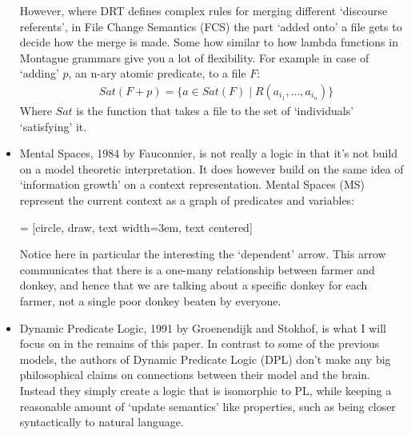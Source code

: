 \documentclass[12pt]{article}
\begin{document}
\begin{itemize}
However, where DRT defines complex rules for merging different `discourse referents', in File Change Semantics (FCS) the part `added onto' a file gets to decide how the merge is made. Some how similar to how lambda functions in Montague grammars give you a lot of flexibility. For example in case of `adding' $p$, an n-ary atomic predicate, to a file $F$:
%
\begin{align}
&Sat(F + p) = \{a \in Sat(F) \mid R(a_{i_1}, \dots, a_{i_n})\} \nonumber
\end{align}
%
Where $Sat$ is the function that takes a file to the set of `individuals' `satisfying' it.

\item Mental Spaces, 1984 by Fauconnier\cite{fauconnier1984espaces}, is not really a logic in that it's not build on a model theoretic interpretation. It does however build on the same idea of `information growth' on a context representation. Mental Spaces (MS) represent the current context as a graph of predicates and variables:

 = [circle, draw, text width=3em, text centered]

Notice here in particular the interesting the `dependent' arrow. This arrow communicates that there is a one-many relationship between farmer and donkey, and hence that we are talking about a specific donkey for each farmer, not a single poor donkey beaten by everyone.

\item Dynamic Predicate Logic, 1991 by Groenendijk and Stokhof\cite{groenendijk1991dynamic}, is what I will focus on in the remains of this paper. In contrast to some of the previous models, the authors of Dynamic Predicate Logic (DPL) don't make any big philosophical claims on connections between their model and the brain. Instead they simply create a logic that is isomorphic to PL, while keeping a reasonable amount of `update semantics' like properties, such as being closer syntactically to natural language.


\end{itemize}
\end{document}
